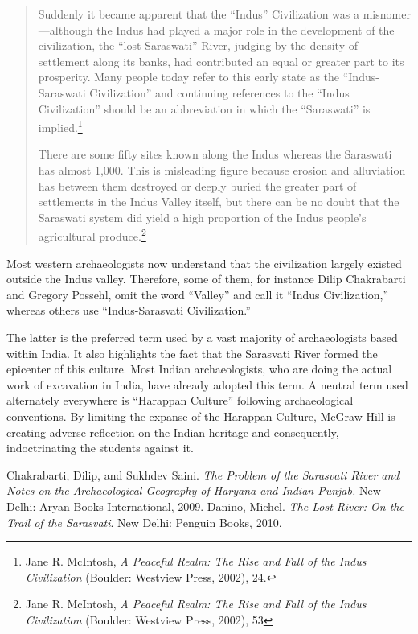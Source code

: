 \begin{quotation}
\indent Suddenly it became apparent that the “Indus” Civilization was a misnomer—although the Indus had played a major role in the development of the civilization, the “lost Saraswati” River, judging by the density of settlement along its banks, had contributed an equal or greater part to its prosperity. Many people today refer to this early state as the “Indus-Saraswati Civilization” and continuing references to the “Indus Civilization” should be an abbreviation in which the “Saraswati” is implied.\footnote{Jane 	R. McIntosh, \textit{A Peaceful Realm: The Rise and Fall of the Indus Civilization} (Boulder: Westview Press, 2002), 24.}
\medskip

There are some fifty sites known along the Indus whereas the Saraswati has almost 1,000. This is misleading figure because erosion and alluviation has between them destroyed or deeply buried the greater part of settlements in the Indus Valley itself, but there can be no doubt that the Saraswati system did yield a high proportion of the Indus people’s agricultural produce.\footnote{Jane R. McIntosh, \textit{A Peaceful Realm: The Rise and Fall of the Indus Civilization} (Boulder: Westview Press, 2002), 53}
\end{quotation}
Most western archaeologists now understand that the civilization largely existed outside the Indus valley. Therefore, some of them, for instance Dilip Chakrabarti and Gregory Possehl, omit the word “Valley” and call it “Indus Civilization,” whereas others use “Indus-Sarasvati Civilization.” 

The latter is the preferred term used by a vast majority of archaeologists based within India. It also highlights the fact that the Sarasvati River formed the epicenter of this culture. Most Indian archaeologists, who are doing the actual work of excavation in India, have already adopted this term. A neutral term used alternately everywhere is “Harappan Culture” following archaeological conventions. By limiting the expanse of the Harappan Culture, McGraw Hill is creating adverse reflection on the Indian heritage and consequently, indoctrinating the students against it. 

\begin{thebibliography}{99}
 Chakrabarti, Dilip, and Sukhdev Saini. \textit{The Problem of the Sarasvati River and Notes on the Archaeological Geography of Haryana and Indian Punjab.} New Delhi: Aryan Books International, 2009.
 Danino, Michel. \textit{The Lost River: On the Trail of the Sarasvati}. New Delhi: Penguin Books, 2010.
\end{thebibliography}

